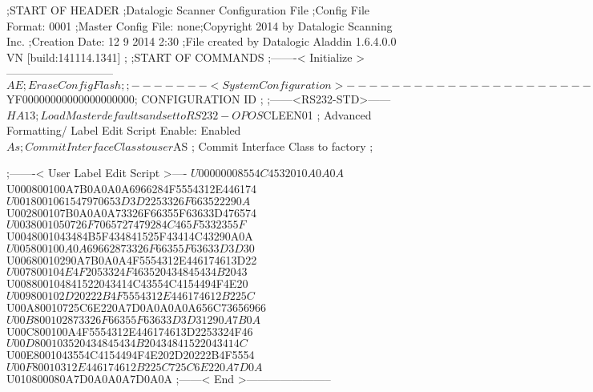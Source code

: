 ;START OF HEADER
;Datalogic Scanner Configuration File
;Config File Format: 0001
;Master Config File: none;Copyright 2014 by Datalogic Scanning Inc.
;Creation Date: 12 9 2014 2:30
;File created by Datalogic Aladdin 1.6.4.0.0 VN [build:141114.1341]
;
;START OF COMMANDS
;-------< Initialize >-----------------------------
$AE                 ; Erase Config Flash
;
;-------< System Configuration >-------------------------------
$YF00000000000000000000; CONFIGURATION ID
;
;------<RS232-STD>------
$HA13               ; Load Master defaults and set to RS232-OPOS
$CLEEN01            ; Advanced Formatting/ Label Edit Script Enable: Enabled
$As                 ; Commit Interface Class to user
$AS                 ; Commit Interface Class to factory
;

;-------< User Label Edit Script >----
$U00000008554C4532010A0A0A
$U000800100A7B0A0A0A6966284F5554312E446174
$U0018001061547970653D3D2253326F663522290A
$U002800107B0A0A0A73326F66355F63633D476574
$U0038001050726F7065727479284C465F5332355F
$U0048001043484B5F434841525F43414C43290A0A
$U005800100A0A69662873326F66355F63633D3D30
$U00680010290A7B0A0A4F5554312E446174613D22
$U007800104E4F2053324F463520434845434B2043
$U008800104841522043414C43554C4154494F4E20
$U009800102D20222B4F5554312E446174612B225C
$U00A80010725C6E220A7D0A0A0A0A656C73656966
$U00B800102873326F66355F63633D3D31290A7B0A
$U00C800100A4F5554312E446174613D2253324F46
$U00D800103520434845434B20434841522043414C
$U00E8001043554C4154494F4E202D20222B4F5554
$U00F80010312E446174612B225C725C6E220A7D0A
$U010800080A7D0A0A0A7D0A0A
;------< End >-----------------------
